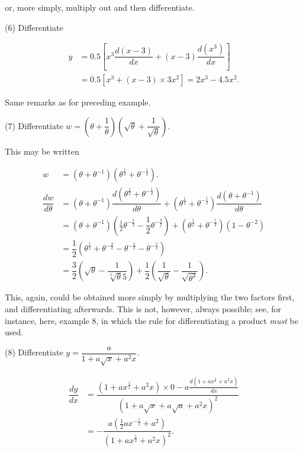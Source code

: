 \documentclass{ximera}
\begin{document}
or, more simply, multiply out and then differentiate.

\par\noindent
(6) Differentiate 

\begin{align*}
y &=0.5\left[x^3\dfrac{d(x−3)}{dx}+(x-3)\dfrac{d(x^3)}{dx}\right]\\
 &=0.5[x^3+(x−3)\times 3x^2]=2x^3−4.5x^2.
\end{align*}

Same remarks as for preceding example.

\par\noindent
(7) Differentiate $w=\left(\theta+\dfrac{1}{\theta}\right)\left(\sqrt{\theta}+\dfrac{1}{\sqrt{\theta}}\right)$.


This may be written

\begin{align*}
w &=(\theta+\theta^{−1})(\theta^{\frac{1}{2}}+\theta^{−\frac{1}{2}}).\\
\dfrac{dw}{d\theta} &=(\theta+\theta^{−1})\dfrac{d(\theta^{\frac{1}{2}}+\theta^{−\frac{1}{2}})}{d\theta}+(\theta^{\frac{1}{2}}+\theta^{−\frac{1}{2}})\dfrac{d(
\theta+\theta^{−1})}{d\theta}\\
&=(\theta+\theta^{−1})(\frac{1}{2}\theta^{−\frac{1}{2}}−\dfrac{1}{2}\theta^{−\frac{3}{2}})+(\theta^{\frac{1}{2}}+\theta^{−\frac{1}{2}})(1−\theta^{−2})\\
&=\dfrac{1}{2}(\theta^{\frac{1}{2}}+\theta^{−\frac{3}{2}}−\theta^{−\frac{1}{2}}−\theta^{−\frac{5}{2}})\\
&=\dfrac{3}{2}\left(\sqrt{\theta}−\dfrac{1}{\sqrt[5]{\theta}5}\right)+\dfrac{1}{2}\left(\dfrac{1}{\sqrt{\theta}}−\dfrac{1}{\sqrt{\theta^3}}\right).
\end{align*}

This, again, could be obtained more simply by multiplying the two factors first, and differentiating afterwards. 
This is not, however, always possible; see, for instance, here, example 8, in which the rule for differentiating 
a product \emph{must} be used.

\par\noindent
(8) Differentiate $y=\dfrac{a}{1+a\sqrt{x}+a^2x}$.

\begin{align*}
\dfrac{dy}{dx} &=\dfrac{(1+ax^{\frac{1}{2}}+a^2x)\times 0−a\frac{d(1+ax^{\frac{1}{2}}+a^2x)}{dx}}{(1+a\sqrt{x}+a\sqrt{a}+a^2x)^2}\\
 &=−\dfrac{a(\frac{1}{2}ax^{−\frac{1}{2}}+a^2)}{(1+ax^{\frac{1}{2}}+a^2x)^2}.\\
\end{align*}
\end{document}
